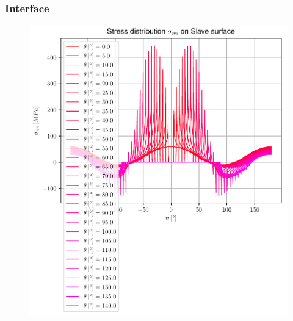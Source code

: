 \documentclass[first,firstsupp,lastsupp,handout,last,hyperref,table]{ETHclass}
\begin{document}
\begin{frame}
\frametitle{\vspace{0.35cm}\scriptsize Interface}
\vspace{-0.85cm}
\begin{figure}
\includegraphics[height=0.9\textheight]{2017-03-03_AbqRunSummary_AllNormalStressOnSlave.pdf}
\end{figure}
\end{frame}
\end{document}
